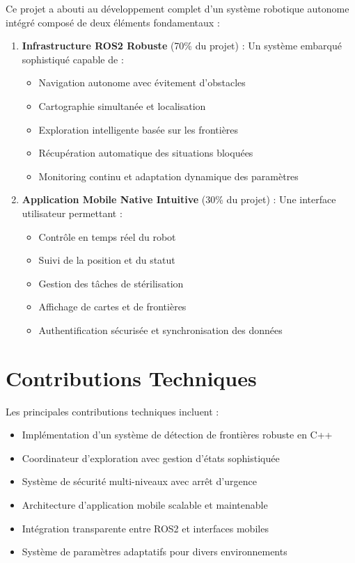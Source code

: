 \documentclass[12pt,a4paper,oneside]{report}
\begin{document}
Ce projet a abouti au développement complet d'un système robotique autonome intégré composé de deux éléments fondamentaux :

\begin{enumerate}
  \item \textbf{Infrastructure ROS2 Robuste} (70\% du projet) : Un système embarqué sophistiqué capable de :
  \begin{itemize}
    \item Navigation autonome avec évitement d'obstacles
    \item Cartographie simultanée et localisation
    \item Exploration intelligente basée sur les frontières
    \item Récupération automatique des situations bloquées
    \item Monitoring continu et adaptation dynamique des paramètres
  \end{itemize}
  
  \item \textbf{Application Mobile Native Intuitive} (30\% du projet) : Une interface utilisateur permettant :
  \begin{itemize}
    \item Contrôle en temps réel du robot
    \item Suivi de la position et du statut
    \item Gestion des tâches de stérilisation
    \item Affichage de cartes et de frontières
    \item Authentification sécurisée et synchronisation des données
  \end{itemize}
\end{enumerate}

\section{Contributions Techniques}

Les principales contributions techniques incluent :

\begin{itemize}
  \item Implémentation d'un système de détection de frontières robuste en C++
  \item Coordinateur d'exploration avec gestion d'états sophistiquée
  \item Système de sécurité multi-niveaux avec arrêt d'urgence
  \item Architecture d'application mobile scalable et maintenable
  \item Intégration transparente entre ROS2 et interfaces mobiles
  \item Système de paramètres adaptatifs pour divers environnements
\end{itemize}
\end{document}
